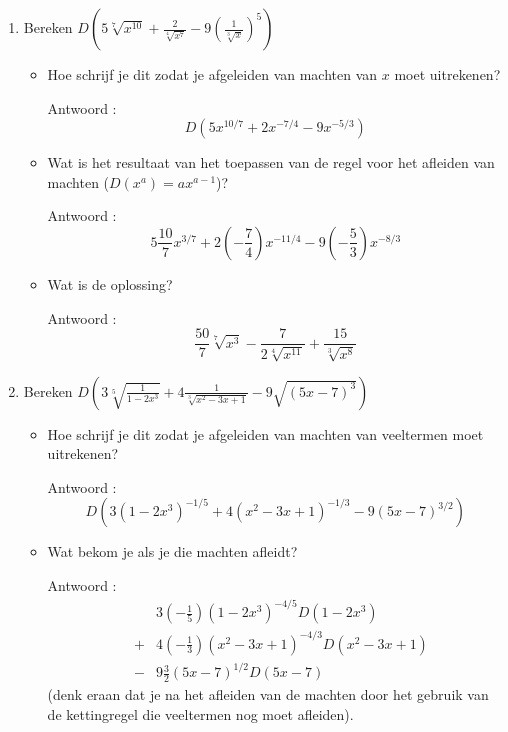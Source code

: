 \begin{enumerate}
	
	\item Bereken $D \left( 5\sqrt[7] {x^{10}}+\frac {2}{\sqrt[4]{x^7}}-9 \left( \frac {1}{\sqrt [3]{x}}  \right)^5 \right)$
	
	\begin{itemize}
		\item Hoe schrijf je dit zodat je afgeleiden van machten van $x$ moet uitrekenen?
		
		Antwoord : \[D \left(  5x^{10/7}+2x^{-7/4}-9x^{-5/3}  \right)\]
		
		\item Wat is het resultaat van het toepassen van de regel voor het afleiden van machten ($D(x^a)=ax^{a-1}$)?
		
		Antwoord : \[5\frac{10}{7}x^{3/7}+2\left( -\frac{7}{4} \right)x^{-11/4}-9\left(  -\frac{5}{3}  \right) x^{-8/3}\]
		
		\item Wat is de oplossing?
		
		Antwoord : \[\frac {50}{7}\sqrt[7]{x^3}-\frac{7}{2\sqrt[4]{x^{11}}}+\frac{15}{\sqrt[3]{x^8}}\]
		
	\end{itemize}
	
	\item Bereken $D \left(  3 \sqrt[5]{\frac{1}{1-2x^3}}+4\frac{1}{\sqrt[3]{x^2-3x+1}}-9\sqrt{(5x-7)^3}  \right)$
	
	\begin{itemize}
		
		\item Hoe schrijf je dit zodat je afgeleiden van machten van veeltermen moet uitrekenen?
		
		Antwoord : \[D \left( 3 \left(  1-2x^3 \right)^{-1/5}+4 \left( x^2-3x+1  \right)^{-1/3}-9 \left(  5x-7 \right)^{3/2}  \right)\]
		
		\item Wat bekom je als je die machten afleidt? 
		
		Antwoord :
		\begin{eqnarray*}
		&& 3\left(- \frac{1}{5} \right)\left( 1-2x^3  \right)^{-4/5}D\left( 1-2x^3  \right) \\
		&+&4\left( -\frac{1}{3}  \right)\left( x^2-3x+1  \right)^{-4/3}D\left( x^2-3x+1  \right) \\
		&-&9\frac{3}{2}\left( 5x-7  \right)^{1/2}D(5x-7)
		\end{eqnarray*}
		 (denk eraan dat je na het afleiden van de machten door het gebruik van de kettingregel die veeltermen nog moet afleiden).
		

\end{itemize}
\end{enumerate}
